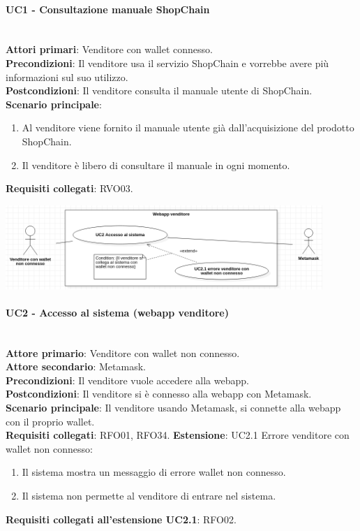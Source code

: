 \documentclass[a4paper, 12pt]{article}
\begin{document}
\paragraph{UC1 - Consultazione manuale ShopChain}\\
\textbf{Attori primari}: Venditore con wallet connesso.\\
\textbf{Precondizioni}: Il venditore usa il servizio ShopChain e vorrebbe avere più informazioni sul suo utilizzo.\\
\textbf{Postcondizioni}: Il venditore consulta il manuale utente di ShopChain.\\
\textbf{Scenario principale}:
\begin{enumerate}
\item Al venditore viene fornito il manuale utente già dall'acquisizione del prodotto ShopChain.
\item Il venditore è libero di consultare il manuale in ogni momento.
\end{enumerate}
\textbf{Requisiti collegati}: RVO03.

\includegraphics[width=0.9\textwidth]{UC_WAV2}

\paragraph{UC2 - Accesso al sistema (webapp venditore)}\\
\textbf{Attore primario}: Venditore con wallet non connesso.\\
\textbf{Attore secondario}: Metamask.\\
\textbf{Precondizioni}: Il venditore vuole accedere alla webapp.\\
\textbf{Postcondizioni}: Il venditore si è connesso alla webapp con Metamask.\\
\textbf{Scenario principale}:
Il venditore usando Metamask, si connette alla webapp con il proprio wallet.\\
\textbf{Requisiti collegati}: RFO01, RFO34.
\textbf{Estensione}:
UC2.1 Errore venditore con wallet non connesso:
\begin{enumerate}
    \item Il sistema mostra un messaggio di errore wallet non connesso.
    \item Il sistema non permette al venditore di entrare nel sistema.
\end{enumerate}
\textbf{Requisiti collegati all'estensione UC2.1}: RFO02.
\end{document}

